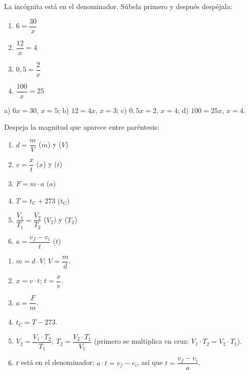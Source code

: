\begin{exercise}
    La incógnita está en el denominador. Súbela primero y después despéjala:
    \begin{enumerate}[label=\letraminuscula]
        \item \(6 = \dfrac{30}{x}\)
        \item \(\dfrac{12}{x} = 4\)
        \item \(0{,}5 = \dfrac{2}{x}\)
        \item \(\dfrac{100}{x} = 25\)
    \end{enumerate}
    \begin{solu}
        a) \(6x = 30\), \(x = 5\); b) \(12 = 4x\), \(x = 3\); c) \(0{,}5x = 2\), \(x = 4\); d) \(100 = 25x\), \(x = 4\).
    \end{solu}
\end{exercise}

\begin{exercise}
    Despeja la magnitud que aparece entre paréntesis:
    \begin{enumerate}[label=\letraminuscula]
        \item \(d = \dfrac{m}{V}\) \quad (\(m\)) y (\(V\))
        \item \(v = \dfrac{x}{t}\) \quad (\(x\)) y (\(t\))
        \item \(F = m \cdot a\) \quad (\(a\))
        \item \(T = t_{\text{C}} + 273\) \quad (\(t_{\text{C}}\))
        \item \(\dfrac{V_1}{T_1} = \dfrac{V_2}{T_2}\) \quad (\(V_2\)) y (\(T_2\))
        \item \(a = \dfrac{v_f - v_i}{t}\) \quad (\(t\))
    \end{enumerate}
    \begin{solu}
        \begin{enumerate}[label=\alph*)]
            \item \(m = d \cdot V\); \(V = \dfrac{m}{d}\).
            \item \(x = v \cdot t\); \(t = \dfrac{x}{v}\).
            \item \(a = \dfrac{F}{m}\).
            \item \(t_{\text{C}} = T - 273\).
            \item \(V_2 = \dfrac{V_1 \cdot T_2}{T_1}\); \(T_2 = \dfrac{V_2 \cdot T_1}{V_1}\) (primero se multiplica en cruz: \(V_1 \cdot T_2 = V_2 \cdot T_1\)).
            \item \(t\) está en el denominador: \(a \cdot t = v_f - v_i\), así que \(t = \dfrac{v_f - v_i}{a}\).
        \end{enumerate}
    \end{solu}
\end{exercise}

